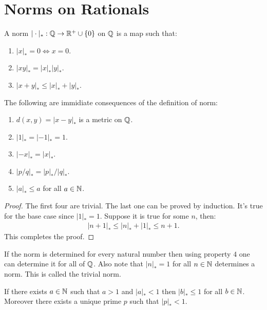 \section{Norms on Rationals}
\begin{definition}
  A norm $|\cdot|_*:\mathbb{Q} \to \mathbb{R}^+\cup\{0\}$ on $\mathbb{Q}$ is a map such that:
  \begin{enumerate}
    \item $|x|_* = 0 \iff x=0$.
    \item $|xy|_* = |x|_*|y|_*$.
    \item $|x+y|_*\leq |x|_*+|y|_*$.
  \end{enumerate}
\end{definition}
\begin{proposition}
  The following are immidiate consequences of the definition of norm:
  \begin{enumerate}
    \item $d(x,y) = |x-y|_*$ is a metric on $\mathbb{Q}$.
    \item $|1|_* = |-1|_* = 1$.
    \item $|-x|_* = |x|_*$.
    \item $|p/q|_* = |p|_*/|q|_*$.
    \item $|a|_*\leq a$ for all $a\in \mathbb{N}$.
  \end{enumerate}
\end{proposition}
\begin{proof}
  The first four are trivial. The last one can be proved by induction. It's true for the base case since $|1|_* = 1$. Suppose it is true for some $n$, then:
  \begin{align*}
    |n+1|_* \leq |n|_* + |1|_* \leq n+1.
  \end{align*}
  This completes the proof.
\end{proof}
\begin{remark}
  If the norm is determined for every natural number then using property $4$ one can determine it for all of $\mathbb{Q}$. Also note that $|n|_* = 1$ for all $n\in \mathbb{N}$ determines a norm. This is called the trivial norm.
\end{remark}
\begin{lemma}\label{lem:ostro}
  If there exists $a\in \mathbb{N}$ such that $a>1$ and $|a|_* <1$ then $|b|_* \leq 1$ for all $b\in \mathbb{N}$. Moreover there exists a unique prime $p$ such that $|p|_* < 1$.
\end{lemma}
